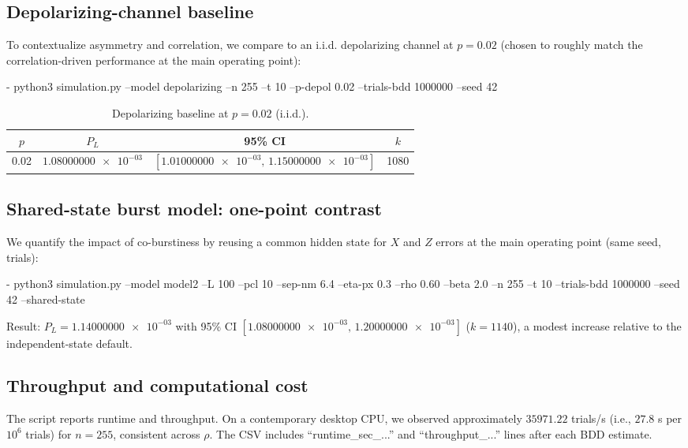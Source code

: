\documentclass[conference]{IEEEtran}
\newcommand{\nexact}[1]{\num[round-mode=off]{#1}}
\newcommand{\simL}{100}
\newcommand{\simpcl}{10}
\newcommand{\simsep}{6.4}
\newcommand{\simeta}{0.3}
\newcommand{\simn}{255}
\newcommand{\simt}{10}
\newcommand{\simtrials}{1000000}
\newcommand{\simseed}{42}
\newcommand{\simrhoB}{0.60}
\newcommand{\simDepolP}{0.02}
\newcommand{\simDepolPL}{1.08000000e-03}
\newcommand{\simDepolPLlo}{1.01000000e-03}
\newcommand{\simDepolPLhi}{1.15000000e-03}
\newcommand{\simDepolk}{1080}
\newcommand{\simSharedPL}{1.14000000e-03}
\newcommand{\simSharedPLlo}{1.08000000e-03}
\newcommand{\simSharedPLhi}{1.20000000e-03}
\newcommand{\simSharedk}{1140}
\newcommand{\simThroughput}{35971.22}
\newcommand{\simRuntime}{27.8}
\begin{document}
\subsection{Depolarizing-channel baseline}
To contextualize asymmetry and correlation, we compare to an i.i.d. depolarizing channel at \(p=\simDepolP\) (chosen to roughly match the correlation-driven performance at the main operating point):

- python3 simulation.py --model depolarizing --n \simn{} --t \simt{} --p-depol \simDepolP{} --trials-bdd \simtrials{} --seed \simseed

\begin{table}[t!]
\small
\centering
\caption{Depolarizing baseline at \(p=\simDepolP\) (i.i.d.).}
\label{tab:depol}
\begin{adjustbox}{width=\linewidth}
\begin{tabular}{cccc}
\toprule
\(p\) & \(P_L\) & 95\% CI & \(k\) \\
\midrule
\simDepolP & \(\nexact{\simDepolPL}\) & \([\nexact{\simDepolPLlo},\,\nexact{\simDepolPLhi}]\) & \simDepolk \\
\bottomrule
\end{tabular}
\end{adjustbox}
\end{table}

\subsection{Shared-state burst model: one-point contrast}\label{sec:shared}
We quantify the impact of co-burstiness by reusing a common hidden state for \(X\) and \(Z\) errors at the main operating point (same seed, trials):

- python3 simulation.py --model model2 --L \simL{} --pcl \simpcl{} --sep-nm \simsep{} --eta-px \simeta{} --rho \simrhoB{} --beta 2.0 --n \simn{} --t \simt{} --trials-bdd \simtrials{} --seed \simseed{} --shared-state

Result: \(P_L=\nexact{\simSharedPL}\) with 95\% CI \([\nexact{\simSharedPLlo},\,\nexact{\simSharedPLhi}]\) (\(k=\simSharedk\)), a modest increase relative to the independent-state default.

\subsection{Throughput and computational cost}
The script reports runtime and throughput. On a contemporary desktop CPU, we observed approximately \(\simThroughput\) trials/s (i.e., \(\simRuntime\) s per \(10^6\) trials) for \(n=\simn\), consistent across \(\rho\). The CSV includes “runtime\_sec\_...” and “throughput\_...” lines after each BDD estimate.
\end{document}
